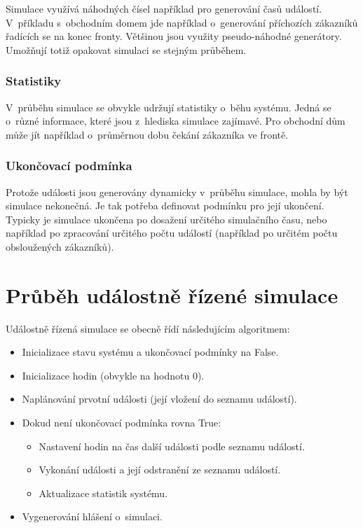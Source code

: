 Simulace využívá náhodných čísel například pro generování časů událostí. V~příkladu s~obchodním domem jde například o~generování příchozích zákazníků řadících se na konec fronty. Většinou jsou využity pseudo-náhodné generátory. Umožňují totiž opakovat simulaci se stejným průběhem.

\subsubsection{Statistiky}

V~průběhu simulace se obvykle udržují statistiky o~běhu systému. Jedná se o~různé informace, které jsou z~hlediska simulace zajímavé. Pro obchodní dům může jít například o~průměrnou dobu čekání zákazníka ve frontě.

\subsubsection{Ukončovací podmínka}

Protože události jsou generovány dynamicky v~průběhu simulace, mohla by být simulace nekonečná. Je tak potřeba definovat podmínku pro její ukončení. Typicky je simulace ukončena po dosažení určitého simulačního času, nebo například po zpracování určitého počtu událostí (například po určitém počtu obsloužených zákazníků).

\section{Průběh událostně řízené simulace}

Událostně řízená simulace se obecně řídí následujícím algoritmem:

\begin{itemize}
\item Inicializace stavu systému a ukončovací podmínky na False. 
\item Inicializace hodin (obvykle na hodnotu 0).
\item Naplánování prvotní události (její vložení do seznamu událostí).
\item Dokud není ukončovací podmínka rovna True:
\begin{itemize}
\item Nastavení hodin na čas další události podle seznamu událostí.
\item Vykonání události a její odstranění ze seznamu událostí.
\item Aktualizace statistik systému.
\end{itemize}
\item Vygenerování hlášení o~simulaci.
\end{itemize}

